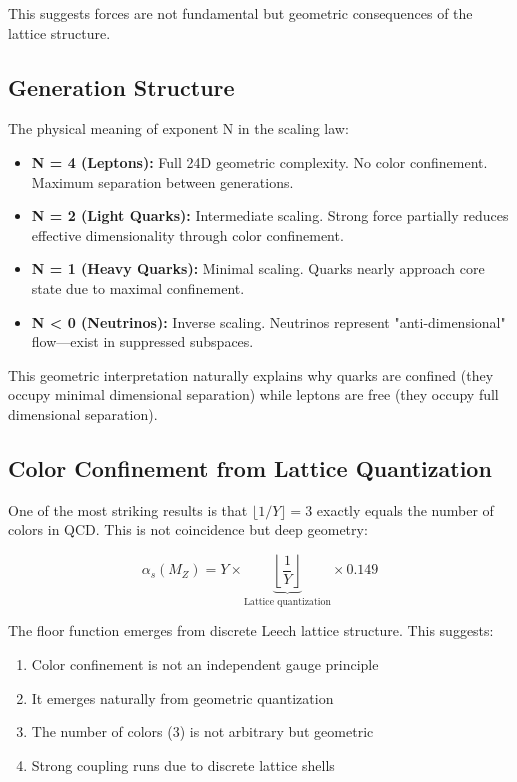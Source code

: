 \documentclass[11pt,twocolumn]{article}
\begin{document}
This suggests forces are not fundamental but geometric consequences of the lattice structure.

\subsection{Generation Structure}

The physical meaning of exponent N in the scaling law:

\begin{itemize}
\item \textbf{N = 4 (Leptons):} Full 24D geometric complexity. No color confinement. Maximum separation between generations.

\item \textbf{N = 2 (Light Quarks):} Intermediate scaling. Strong force partially reduces effective dimensionality through color confinement.

\item \textbf{N = 1 (Heavy Quarks):} Minimal scaling. Quarks nearly approach core state due to maximal confinement.

\item \textbf{N < 0 (Neutrinos):} Inverse scaling. Neutrinos represent "anti-dimensional" flow—exist in suppressed subspaces.
\end{itemize}

This geometric interpretation naturally explains why quarks are confined (they occupy minimal dimensional separation) while leptons are free (they occupy full dimensional separation).

\subsection{Color Confinement from Lattice Quantization}

One of the most striking results is that $\lfloor 1/Y \rfloor = 3$ exactly equals the number of colors in QCD. This is not coincidence but deep geometry:

\begin{equation}
\alpha_s(M_Z) = Y \times \underbrace{\left\lfloor \frac{1}{Y} \right\rfloor}_{\text{Lattice quantization}} \times 0.149
\end{equation}

The floor function emerges from discrete Leech lattice structure. This suggests:

\begin{enumerate}
\item Color confinement is not an independent gauge principle
\item It emerges naturally from geometric quantization
\item The number of colors (3) is not arbitrary but geometric
\item Strong coupling runs due to discrete lattice shells
\end{enumerate}
\end{document}
